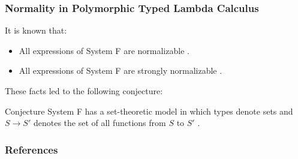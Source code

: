 \begin{frame}[fragile]
    \frametitle{Normality in Polymorphic Typed Lambda Calculus}
  
    It is known that:
    \begin{itemize}
        \item All expressions of System F are normalizable \cite{girard1972phd}.
        \item All expressions of System F are strongly normalizable \cite{PRAWITZ1971235}.
    \end{itemize}

    These facts led to the following conjecture:
    \begin{alertblock}{Conjecture}
		System F has a set-theoretic model in which types denote sets and $S \rightarrow S'$ denotes the set of all functions from $S$ to $S'$ \cite{reynolds1983types}.
	\end{alertblock}
\end{frame}


\begin{frame}
\frametitle{References}


\end{frame}


